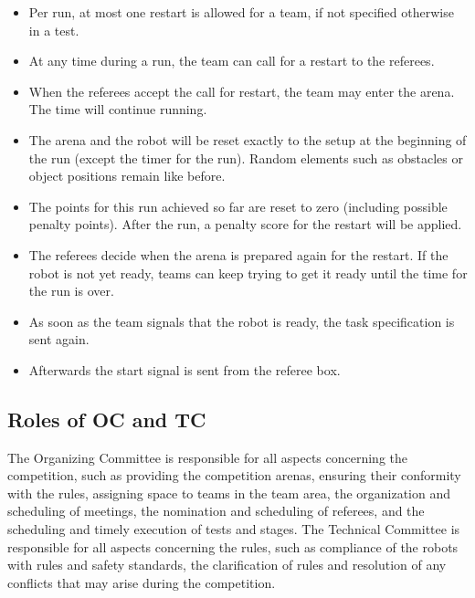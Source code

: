\begin{itemize}

	\item Per run, at most one restart is allowed for a team, if not specified 			otherwise in a test.
	\item At any time during a run, the team can call for a restart to the 				referees.
	\item When the referees accept the call for restart, the team may enter the 			arena. The time will continue running.
	\item The arena and the robot will be reset exactly to the setup at the 				beginning of the run (except the timer for the run). Random elements such as 			obstacles or object positions remain like before.
	\item The points for this run achieved so far are reset to zero (including 			possible penalty points). After the run, a penalty score for the restart will 	be applied.
	\item The referees decide when the arena is prepared again for the restart. If 	the robot is not yet ready, teams can keep trying to get it ready until the 			time for the run is over.
	\item As soon as the team signals that the robot is ready, the task 					specification is sent again.
	\item Afterwards the start signal is sent from the referee box.

\end{itemize}

\subsection{Roles of OC and TC}
The Organizing Committee is responsible for all aspects concerning the competition, such as providing the competition arenas, ensuring their conformity with the rules, assigning space to teams in the team area, the organization and scheduling of meetings, the nomination and scheduling of referees, and the scheduling and timely execution of tests and stages.
The Technical Committee is responsible for all aspects concerning the rules, such as compliance of the robots with rules and safety standards, the clarification of rules and resolution of any conflicts that may arise during the competition.

